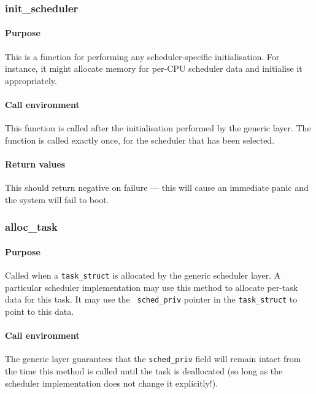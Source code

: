 \documentclass[11pt,twoside,final,openright]{xenstyle}
\begin{document}
\subsubsection{init\_scheduler}

\paragraph*{Purpose}

This is a function for performing any scheduler-specific initialisation.  For
instance, it might allocate memory for per-CPU scheduler data and initialise it
appropriately.

\paragraph*{Call environment}

This function is called after the initialisation performed by the generic
layer.  The function is called exactly once, for the scheduler that has been
selected.

\paragraph*{Return values}

This should return negative on failure --- this will cause an
immediate panic and the system will fail to boot.

\subsubsection{alloc\_task}

\paragraph*{Purpose}
Called when a {\tt task\_struct} is allocated by the generic scheduler
layer.  A particular scheduler implementation may use this method to
allocate per-task data for this task.  It may use the {\tt
sched\_priv} pointer in the {\tt task\_struct} to point to this data.

\paragraph*{Call environment}
The generic layer guarantees that the {\tt sched\_priv} field will
remain intact from the time this method is called until the task is
deallocated (so long as the scheduler implementation does not change
it explicitly!).
\end{document}
